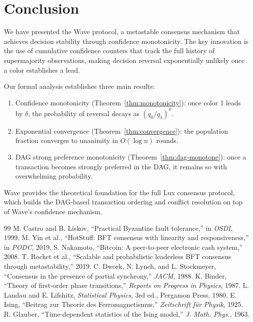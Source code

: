 \section{Conclusion}

\label{sec:conclusion}

We have presented the Wave protocol, a metastable consensus mechanism that achieves
decision stability through confidence monotonicity. The key innovation is the use of
cumulative confidence counters that track the full history of supermajority observations,
making decision reversal exponentially unlikely once a color establishes a lead.

Our formal analysis establishes three main results:
\begin{enumerate}[nosep]
\item Confidence monotonicity (Theorem~\ref{thm:monotonicity}): once color 1 leads by
$\delta$, the probability of reversal decays as $(q_0/q_1)^\delta$.
\item Exponential convergence (Theorem~\ref{thm:convergence}): the population fraction
converges to unanimity in $O(\log n)$ rounds.
\item DAG strong preference monotonicity (Theorem~\ref{thm:dag-monotone}): once a
transaction becomes strongly preferred in the DAG, it remains so with overwhelming
probability.
\end{enumerate}

Wave provides the theoretical foundation for the full Lux consensus protocol,
which builds the DAG-based transaction ordering and conflict resolution on top of
Wave's confidence mechanism.

\begin{thebibliography}{99}
 M. Castro and B. Liskov, ``Practical Byzantine fault tolerance,'' in \emph{OSDI}, 1999.
 M. Yin et al., ``HotStuff: BFT consensus with linearity and responsiveness,'' in \emph{PODC}, 2019.
 S. Nakamoto, ``Bitcoin: A peer-to-peer electronic cash system,'' 2008.
 T. Rocket et al., ``Scalable and probabilistic leaderless BFT consensus through metastability,'' 2019.
 C. Dwork, N. Lynch, and L. Stockmeyer, ``Consensus in the presence of partial synchrony,'' \emph{JACM}, 1988.
 K. Binder, ``Theory of first-order phase transitions,'' \emph{Reports on Progress in Physics}, 1987.
 L. Landau and E. Lifshitz, \emph{Statistical Physics}, 3rd ed., Pergamon Press, 1980.
 E. Ising, ``Beitrag zur Theorie des Ferromagnetismus,'' \emph{Zeitschrift f\"ur Physik}, 1925.
 R. Glauber, ``Time-dependent statistics of the Ising model,'' \emph{J. Math. Phys.}, 1963.
\end{thebibliography}

